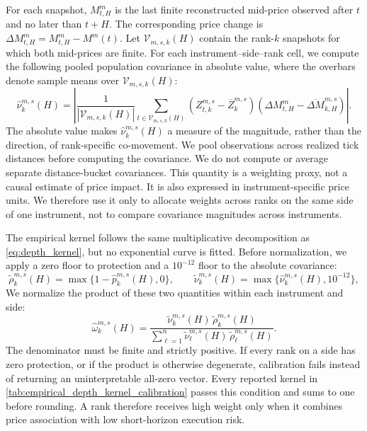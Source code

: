 \documentclass[11pt]{article}
\begin{document}
For each snapshot, $M^m_{t,H}$ is the last finite reconstructed mid-price observed after $t$ and no later than $t+H$.
The corresponding price change is $\Delta M^m_{t,H}=M^m_{t,H}-M^m(t)$. Let $\mathcal{V}_{m,s,k}(H)$ contain the rank-$k$
snapshots for which both mid-prices are finite. For each instrument--side--rank cell, we compute the following pooled
population covariance in absolute value, where the overbars denote sample means over
$\mathcal{V}_{m,s,k}(H)$:
\begin{equation}
    \widehat\nu^{m,s}_{k}(H)
    =
    \left|
        \frac{1}{|\mathcal{V}_{m,s,k}(H)|}
        \sum_{t\in\mathcal{V}_{m,s,k}(H)}
        \left(Z^{m,s}_{t,k}-\overline Z^{m,s}_{k}\right)
        \left(\Delta M^m_{t,H}-\overline{\Delta M}^{m,s}_{k,H}\right)
    \right|.
    \label{eq:empirical_visibility_covariance}
\end{equation}
The absolute value makes $\widehat\nu^{m,s}_{k}(H)$ a measure of the magnitude, rather than the direction, of
rank-specific co-movement. We pool observations across realized tick distances before computing the covariance. We do not
compute or average separate distance-bucket covariances. This quantity is a weighting proxy, not a causal estimate of price
impact. It is also expressed in instrument-specific price units. We therefore use it only to allocate weights across
ranks on the same side of one instrument, not to compare covariance magnitudes across instruments.

The empirical kernel follows the same multiplicative decomposition as \cref{eq:depth_kernel}, but no exponential curve is
fitted. Before normalization, we apply a zero floor to protection and a $10^{-12}$ floor to the absolute covariance:
\begin{equation}
    \widetilde\rho^{m,s}_{k}(H)=\max\{1-\widehat p^{m,s}_{k}(H),0\},
    \qquad
    \widetilde\nu^{m,s}_{k}(H)=\max\{\widehat\nu^{m,s}_{k}(H),10^{-12}\},
    \label{eq:empirical_kernel_floors}
\end{equation}
We normalize the product of these two quantities within each instrument and side:
\begin{equation}
    \widehat\omega^{m,s}_{k}(H)
    =
    \frac{
        \widetilde\nu^{m,s}_{k}(H)\,\widetilde\rho^{m,s}_{k}(H)
    }{
        \sum_{\ell=1}^{n}\widetilde\nu^{m,s}_{\ell}(H)\,\widetilde\rho^{m,s}_{\ell}(H)
    }.
    \label{eq:empirical_depth_kernel}
\end{equation}
The denominator must be finite and strictly positive. If every rank on a side has zero protection, or if the product is
otherwise degenerate, calibration fails instead of returning an uninterpretable all-zero vector. Every reported kernel in
\cref{tab:empirical_depth_kernel_calibration} passes this condition and sums to one before rounding. A rank therefore
receives high weight only when it combines price association with low short-horizon execution risk.
\end{document}

